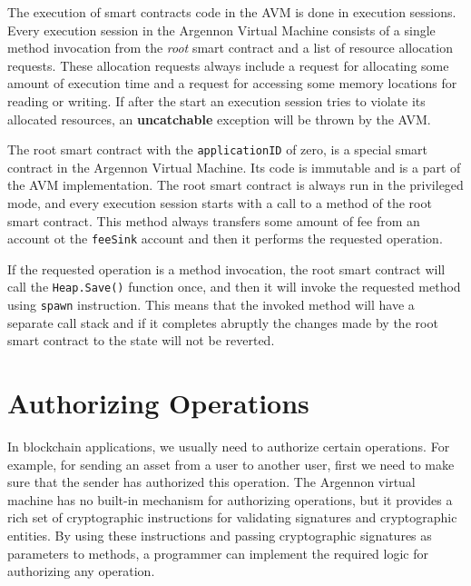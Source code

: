 The execution of smart contracts code in the AVM is done in execution sessions. Every execution session in the
Argennon Virtual Machine consists of a single method invocation from the \emph{root} smart contract and a list
of resource allocation requests. These allocation requests always include a request for allocating some amount
of execution time and a request for accessing some memory locations for reading or writing. If after the start
an execution session tries to violate its allocated resources, an \textbf{uncatchable} exception will
be thrown by the AVM\@.


The root smart contract with the \texttt{applicationID} of zero, is a special smart contract in the Argennon
Virtual Machine. Its code is immutable and is a part of the AVM implementation. The root smart contract is always
run in the privileged mode, and every execution session starts with a call to a method of the root smart contract.
This method always transfers some amount of fee from an account ot the \texttt{feeSink} account and then it
performs the requested operation.


If the requested operation is a method invocation, the root smart contract will call the \texttt{Heap.Save()}
function once, and then it will invoke the requested method using \texttt{spawn} instruction. This means that the
invoked method will have a separate call stack and if it completes abruptly the changes made by the root
smart contract to the state will not be reverted.


\section{Authorizing Operations}\label{sec:authorizing-operations}

In blockchain applications, we usually need to authorize certain operations. For example, for sending an asset
from a user to another user, first we need to make sure that the sender has authorized this operation. The
Argennon virtual machine has no built-in mechanism for authorizing operations, but it provides a rich set of
cryptographic instructions for validating signatures and cryptographic entities. By using these instructions and
passing cryptographic signatures as parameters to methods, a programmer can implement the required logic
for authorizing any operation.

